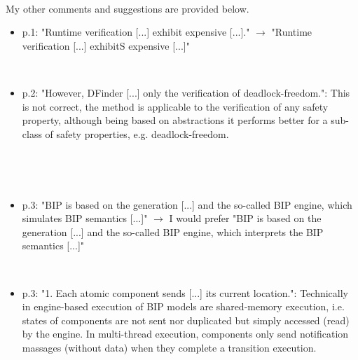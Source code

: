 ~

My other comments and suggestions are provided below.

\begin{itemize}
\item p.1: "Runtime verification [...] exhibit expensive [...]." $\rightarrow$ "Runtime 
verification [...] exhibitS expensive [...]"

~

\done


\item p.2: "However, DFinder [...] only the verification of deadlock-freedom.": 
This is not correct, the method is applicable to the verification of any 
safety property, although being based on abstractions it performs better for 
a sub-class of safety properties, e.g. deadlock-freedom.

~


~

\item p.3: "BIP is based on the generation [...] and the so-called BIP engine, 
which simulates BIP semantics [...]" $\rightarrow$ I would prefer "BIP is based on the 
generation [...] and the so-called BIP engine, which interprets the BIP 
semantics [...]"

~

\done

\item p.3: "1. Each atomic component sends [...] its current location.": 
Technically in engine-based execution of BIP models are shared-memory 
execution, i.e. states of components are not sent nor duplicated but simply 
accessed (read) by the engine. In multi-thread execution, components only 
send notification massages (without data) when they complete a transition 
execution.

~


\end{itemize}
